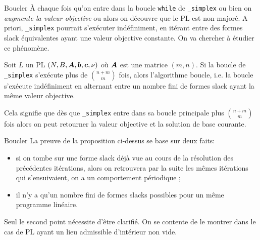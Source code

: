 \documentclass[aspectratio = 169]{beamer}
\begin{document}
\begin{frame}{Boucler}
  À chaque fois qu'on entre dans la boucle \texttt{while}
  de \texttt{_simplex} ou bien on \textit{augmente la
    valeur objective} ou alors on découvre que le PL est non-majoré. A
  priori, \texttt{_simplex} pourrait s'exécuter
  indéfiniment, en itérant entre des formes slack équivalentes ayant
  une valeur objective constante. On va chercher à étudier ce
  phénomène.
  \pause
  \begin{prop}[\textbf{C}]
    Soit $L$ un PL $(N, B, \boldsymbol{A}, \boldsymbol{b}, \boldsymbol{c}, \nu)$ où $\boldsymbol{A}$
    est une matrice $(m, n)$. Si la boucle de
    \texttt{_simplex} s'exécute plus de $\binom{n+m}{m}$
    fois, alors l'algorithme boucle, i.e. la boucle s'exécute
    indéfiniment en alternant entre un nombre fini de formes slack
    ayant la même valeur objective.
  \end{prop}
  \begin{rem}
    Cela signifie que dès que \texttt{_simplex} entre
    dans sa boucle principale plus $\binom{n+m}{m}$ fois alors on
    peut retourner la valeur objective et la solution de base
    courante.
  \end{rem}
\end{frame}

\begin{frame}{Boucler}
  La preuve de la proposition ci-dessus se base sur deux faits:
  \begin{itemize}
  \item si on tombe sur une forme slack déjà vue au cours de la
    résolution des précédentes itérations, alors on retrouvera par
    la suite les mêmes itérations qui s'ensuivaient, on a un
    comportement périodique ;
  \item il n'y a qu'un nombre fini de formes slacks possibles pour
    un même programme linéaire.
  \end{itemize}

  \pause Seul le second point nécessite d'être clarifié. On se
  contente de le montrer dans le cas de PL ayant un lieu admissible
  d'intérieur non vide.
\end{frame}
\end{document}
